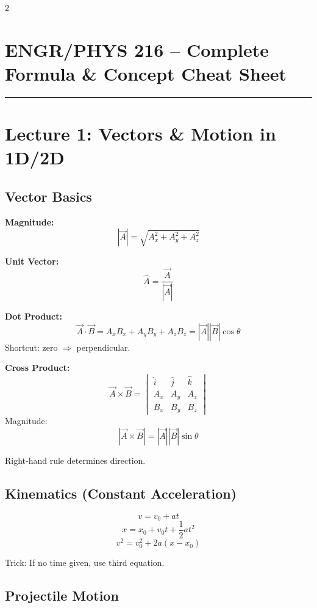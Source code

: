 \documentclass[10pt,landscape]{article}
\begin{document}
\begin{multicols}{2}

\section*{ENGR/PHYS 216 -- Complete Formula \& Concept Cheat Sheet}
\hrule
\vspace{0.3em}


\section*{Lecture 1: Vectors \& Motion in 1D/2D}

\subsection*{Vector Basics}

\textbf{Magnitude:}
\[
|\vec{A}| = \sqrt{A_x^2 + A_y^2 + A_z^2}
\]

\textbf{Unit Vector:}
\[
\hat{A} = \frac{\vec{A}}{|\vec{A}|}
\]

\textbf{Dot Product:}
\[
\vec{A}\cdot\vec{B} = A_xB_x + A_yB_y + A_zB_z = |\vec{A}||\vec{B}|\cos\theta
\]
Shortcut: zero $\Rightarrow$ perpendicular.

\textbf{Cross Product:}
\[
\vec{A}\times\vec{B} =
\begin{vmatrix}
\hat{i} & \hat{j} & \hat{k}\\
A_x & A_y & A_z\\
B_x & B_y & B_z
\end{vmatrix}
\]
Magnitude:
\[
|\vec{A}\times\vec{B}| = |\vec{A}||\vec{B}|\sin\theta
\]

Right-hand rule determines direction.

\subsection*{Kinematics (Constant Acceleration)}

\[
v = v_0 + at
\]
\[
x = x_0 + v_0 t + \frac{1}{2}at^2
\]
\[
v^2 = v_0^2 + 2a(x-x_0)
\]

Trick: If no time given, use third equation.

\subsection*{Projectile Motion}


\end{multicols}
\end{document}

